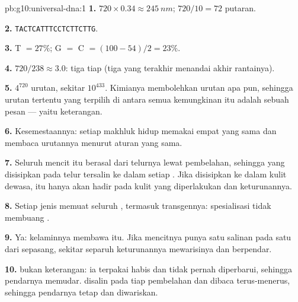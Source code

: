 \begin{solution}{pb:g10:universal-dna:1}
\textbf{1.} $720 \times 0.34 \approx \qty{245}{nm}$; $720/10 = 72$
putaran.

\textbf{2.} \texttt{TACTCATTTCCTCTTCTTG}.

\textbf{3.} T $= 27\%$; G $=$ C $= (100 - 54)/2 = 23\%$.

\textbf{4.} $720/238 \approx 3.0$: tiga  tiap  (tiga yang
terakhir menandai akhir rantainya).

\textbf{5.} $4^{720}$ urutan, sekitar $10^{433}$. Kimianya membolehkan
urutan apa pun, sehingga urutan tertentu yang terpilih di antara semua
kemungkinan itu adalah sebuah pesan --- yaitu keterangan.

\textbf{6.} Kesemestaannya: setiap makhluk hidup memakai empat
 yang sama dan membaca urutannya menurut aturan yang sama.

\textbf{7.} Seluruh  mencit itu berasal dari  telurnya lewat
pembelahan, sehingga  yang disisipkan pada  telur tersalin ke
dalam setiap . Jika disisipkan ke dalam kulit dewasa,  itu hanya
akan hadir pada  kulit yang diperlakukan dan keturunannya.

\textbf{8.} Setiap jenis  memuat seluruh , termasuk
transgennya: spesialisasi tidak membuang .

\textbf{9.} Ya:  kelaminnya membawa  itu. Jika mencitnya punya
satu salinan pada satu  dari sepasang, sekitar separuh
keturunannya mewarisinya dan berpendar.

\textbf{10.}  bukan keterangan: ia terpakai habis dan tidak
pernah diperbarui, sehingga pendarnya memudar.  disalin pada tiap
pembelahan dan dibaca terus-menerus, sehingga pendarnya tetap dan diwariskan.


\end{solution}
